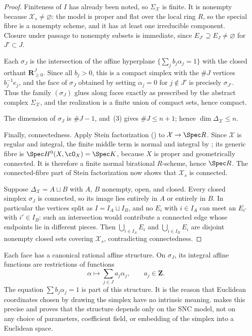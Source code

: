 \begin{proof}
Finiteness of $I$ has already been noted, so $\Sigma_{\mathcal X}$ is
finite. It is nonempty because $\mathcal X_s\neq\varnothing$: the model is
proper and flat over the local ring $R$, so the special fibre is a
nonempty scheme, and it has at least one irreducible component. Closure
under passage to nonempty subsets is immediate, since
$E_{J'}\supseteq E_J\neq\varnothing$ for $J'\subset J$.

Each $\sigma_J$ is the intersection of the affine hyperplane
$\{\sum_jb_j\alpha_j=1\}$ with the closed orthant
$\mathbf R_{\geq0}^J$. Since all $b_j>0$, this is a compact simplex with
the $\#J$ vertices $b_j^{-1}e_j$, and the face of $\sigma_J$ obtained
by setting $\alpha_j=0$ for $j\notin J'$ is precisely $\sigma_{J'}$.
Thus the family $(\sigma_J)$ glues along faces exactly as prescribed by
the abstract complex $\Sigma_{\mathcal X}$, and the realization is a
finite union of compact sets, hence compact.

The dimension of $\sigma_J$ is $\#J-1$, and
\,(3) gives $\#J\le n+1$; hence
$\dim\Delta_{\mathcal X}\le n$.

Finally, connectedness. Apply Stein factorization
() to
$\mathcal X\to\Spec R$.  Since $\mathcal X$ is regular and integral, the
finite middle term is normal and integral by
; its generic fibre is
$\Spec H^0(X,\cO_X)=\Spec K$, because $X$ is proper and geometrically
connected.  It is therefore a finite normal birational $R$-scheme, hence
$\Spec R$.  The connected-fibre part of Stein factorization now shows that
$\mathcal X_s$ is connected.

Suppose $\Delta_{\mathcal X}=A\sqcup B$ with $A$, $B$ nonempty, open, and
closed.  Every closed simplex $\sigma_J$ is connected, so its image lies
entirely in $A$ or entirely in $B$.  In particular the vertices split as
$I=I_A\sqcup I_B$, and no $E_i$ with $i\in I_A$ can meet an $E_{i'}$ with
$i'\in I_B$: such an intersection would contribute a connected edge whose
endpoints lie in different pieces.  Then $\bigcup_{i\in I_A}E_i$ and
$\bigcup_{i\in I_B}E_i$ are disjoint nonempty closed sets covering
$\mathcal X_s$, contradicting connectedness.
\end{proof}

Each face has a canonical rational affine structure. On $\sigma_J$, its
integral affine functions are restrictions of functions
\[
                     \alpha\longmapsto\sum_{j\in J}a_j\alpha_j,
                     \qquad a_j\in\mathbf Z.
\]
The equation $\sum b_j\alpha_j=1$ is part of this structure. It is the
reason that Euclidean coordinates chosen by drawing the simplex have no
intrinsic meaning.  makes this precise and proves
that the structure depends only on the SNC model, not on any choice of
parameters, coefficient field, or embedding of the simplex into a Euclidean
space.

